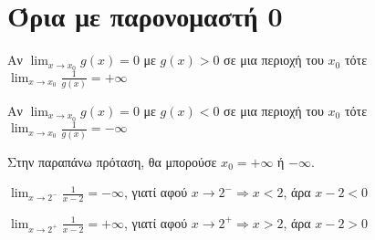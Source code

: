 \section*{Όρια με παρονομαστή 0}

\begin{prop}
\item {}
  \begin{myitemize}
    \item Αν $ \lim_{x \to x_{0}} g(x) = 0 $ με $ g(x)>0 $ σε μια περιοχή του $ x_{0} $ 
      τότε $ \lim_{x \to x_{0}} \frac{1}{g(x)} = + \infty $
    \item Αν $ \lim_{x \to x_{0}} g(x) = 0 $ με $ g(x)<0 $ σε μια περιοχή του $ x_{0} $ 
      τότε $ \lim_{x \to x_{0}} \frac{1}{g(x)} = - \infty $
  \end{myitemize}
\end{prop}

\begin{rem}
  Στην παραπάνω πρόταση, θα μπορούσε $ x_{0} = +\infty $ ή $ - \infty $.
\end{rem}

\begin{example}
  $ \lim_{x \to 2^{-}} \frac{1}{x-2} = - \infty $, γιατί αφού $ x \to 2^{-} 
  \Rightarrow x < 2 $, άρα $ x-2<0 $ 
\end{example}
\begin{example}
  $ \lim_{x \to 2^{+}} \frac{1}{x-2} = + \infty $, γιατί αφού $ x \to 2^{+} 
  \Rightarrow x > 2 $, άρα $ x-2>0 $ 
\end{example}




